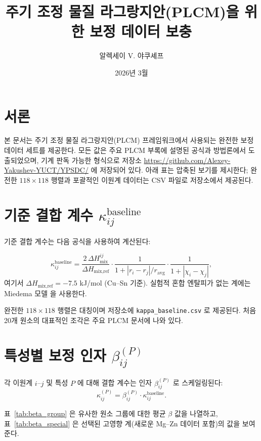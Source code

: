 \documentclass[12pt,a4paper]{article}
\title{주기 조정 물질 라그랑지안(PLCM)을 위한 보정 데이터 보충}
\author{알렉세이 V. 야쿠셰프}
\date{2026년 3월}
\begin{document}
	\maketitle
	
	\tableofcontents
	\newpage
	
	\section{서론}
	본 문서는 주기 조정 물질 라그랑지안(PLCM) 프레임워크에서 사용되는 완전한 보정 데이터 세트를 제공한다. 모든 값은 주요 PLCM 부록에 설명된 공식과 방법론에서 도출되었으며, 기계 판독 가능한 형식으로 저장소 \url{https://github.com/Alexey-Yakushev-YUCT/YPSDC/} 에 저장되어 있다. 아래 표는 압축된 보기를 제시한다; 완전한 $118\times118$ 행렬과 포괄적인 이원계 데이터는 CSV 파일로 저장소에서 제공된다.
	
	\section{기준 결합 계수 $\kappa_{ij}^{\text{baseline}}$}
	기준 결합 계수는 다음 공식을 사용하여 계산된다:
	
	\[
	\kappa_{ij}^{\text{baseline}} = \frac{2\,\Delta H_{\text{mix}}^{ij}}{\Delta H_{\text{mix,ref}}} \cdot
	\frac{1}{1 + |r_i - r_j|/r_{\text{avg}}} \cdot
	\frac{1}{1 + |\chi_i - \chi_j|},
	\]
	여기서 $\Delta H_{\text{mix,ref}} = -7.5$ kJ/mol (Cu–Sn 기준). 실험적 혼합 엔탈피가 없는 계에는 Miedema 모델 \cite{Miedema1980} 을 사용한다.
	
	완전한 $118\times118$ 행렬은 대칭이며 저장소에 \texttt{kappa\_baseline.csv} 로 제공된다. 처음 20개 원소의 대표적인 조각은 주요 PLCM 문서에 나와 있다.
	
	\section{특성별 보정 인자 $\beta_{ij}^{(P)}$}
	각 이원계 $i$–$j$ 및 특성 $P$ 에 대해 결합 계수는 인자 $\beta_{ij}^{(P)}$ 로 스케일링된다:
	\[
	\kappa_{ij}^{(P)} = \beta_{ij}^{(P)} \cdot \kappa_{ij}^{\text{baseline}}.
	\]
	
	표~\ref{tab:beta_group} 은 유사한 원소 그룹에 대한 평균 $\beta$ 값을 나열하고, 표~\ref{tab:beta_special} 은 선택된 고영향 계(새로운 Mg–Zn 데이터 포함)의 값을 보여준다.
	
\end{document}
